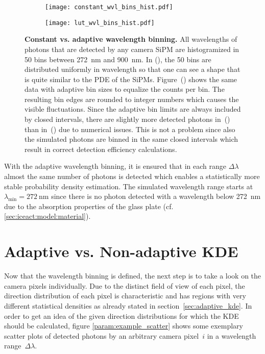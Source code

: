 \begin{figure}[H]
	\centering
	\begin{subfigure}[t]{0.49\textwidth}
		\texttt{[image: constant\_wvl\_bins\_hist.pdf]}
		\label{param:wvl_binning:constant}
	\end{subfigure}
	\hfill
	\begin{subfigure}[t]{0.49\textwidth}
		\texttt{[image: lut\_wvl\_bins\_hist.pdf]}
		\label{param:wvl_binning:adaptive}
	\end{subfigure}
	\caption[Constant vs. adaptive wavelength binning]{\textbf{Constant vs. adaptive wavelength binning.} All wavelengths of photons that are detected by any camera SiPM are histogramized in \num{50} bins between \SI{272}{\nano\meter} and \SI{900}{\nano\meter}. In (), the \num{50} bins are distributed uniformly in wavelength so that one can see a shape that is quite similar to the PDE of the SiPMs. Figure~() shows the same data with adaptive bin sizes to equalize the counts per bin. The resulting bin edges are rounded to integer numbers which causes the visible fluctuations. Since the adaptive bin limits are always included by closed intervals, there are slightly more detected photons in~() than in~() due to numerical issues. This is not a problem since also the simulated photons are binned in the same closed intervals which result in correct detection efficiency calculations.}
	\label{param:wvl_binning}
\end{figure}

With the adaptive wavelength binning, it is ensured that in each range $\Delta\lambda$ almost the same number of photons is detected which enables a statistically more stable probability density estimation. The simulated wavelength range starts at $\lambda_\text{min}=\SI{272}{\nano\meter}$ since there is no photon detected with a wavelength below \SI{272}{\nano\meter} due to the absorption properties of the glass plate (cf. \ref{sec:iceact:model:material}).

\section{Adaptive vs. Non-adaptive KDE}\label{sec:adaptive_vs_nonadaptive}

Now that the wavelength binning is defined, the next step is to take a look on the camera pixels individually. Due to the distinct field of view of each pixel, the direction distribution of each pixel is characteristic and has regions with very different statistical densities as already stated in section~\ref{sec:adaptive_kde}. In order to get an idea of the given direction distributions for which the KDE should be calculated, figure \ref{param:example_scatter} shows some exemplary scatter plots of detected photons by an arbitrary camera pixel~$i$ in a wavelength range~$\Delta\lambda$.\\

